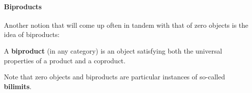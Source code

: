                 \paragraph{Biproducts}
                    Another notion that will come up often in tandem with that of zero objects is the idea of biproducts:
                    \begin{definition}[Biproducts] \label{def: biproducts}
                        A \textbf{biproduct} (in any category) is an object satisfying both the universal properties of a product and a coproduct.
                    \end{definition}
                    \begin{remark}
                        Note that zero objects and biproducts are particular instances of so-called \textbf{bilimits}. 
                    \end{remark}
                    
